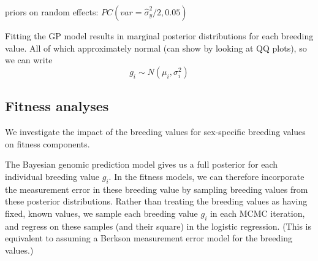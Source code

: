 \documentclass[dvipsnames]{article}
\begin{document}
priors on random effects: $PC(var = \hat{\sigma}^2_y / 2, 0.05)$ 

Fitting the GP model results in marginal posterior distributions for each breeding value. All of which approximately normal (can show by looking at QQ plots), so we can write
\begin{equation*}
    g_i \sim N(\mu_i, \sigma_i^2)
\end{equation*}

\subsection*{Fitness analyses}

We investigate the impact of the breeding values for sex-specific breeding values on fitness components.

The Bayesian genomic prediction model gives us a full posterior for each individual breeding value $g_i$. 
In the fitness models, we can therefore incorporate the measurement error in these breeding value by sampling breeding values from these posterior distributions. 
Rather than treating the breeding values as having fixed, known values, we sample each breeding value $g_i$ in each MCMC iteration, and regress on these samples (and their square) in the logistic regression. 
(This is equivalent to assuming a Berkson measurement error model for the 
breeding values.)
\end{document}
